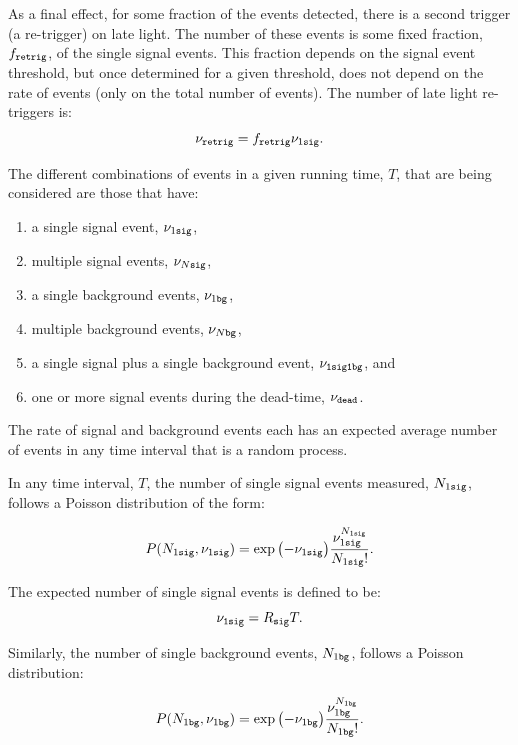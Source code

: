 \documentclass[letter,twocolumn,preprint,3p,numbers,sort&compress]{elsarticle}
\begin{document}
As a final effect, for some fraction of the events detected, there is
a second trigger (a re-trigger) on late light.  The number of these
events is some fixed fraction, $f_{\tt retrig}$, of the single signal
events.  This fraction depends on the signal event threshold, but once
determined for a given threshold, does not depend on the rate of
events (only on the total number of events).  The number of late light
re-triggers is:
\begin{equation}\label{eq:retrig}
\nu_{\tt retrig} = f_{\tt retrig} \nu_{1\tt sig}.
\end{equation}

The different combinations of events in a given running time, $T$,
that are being considered are those that have:
\begin{enumerate}
\item a single signal event, $\nu_{1\tt sig}$,     
\item multiple signal events, $\nu_{N\tt sig}$,    
\item a single background events, $\nu_{1\tt bg}$,
\item multiple background events, $\nu_{N\tt bg}$,
\item a single signal plus a single background event, $\nu_{\tt 1 sig 1 bg}$, and
\item one or more signal events during the dead-time, $\nu_{\tt dead}$. 
\end{enumerate}
The rate of signal and background events each has an expected average
number of events in any time interval that is a random process.

In any time interval, $T$, the number of single signal events
measured, $N_{1\tt sig}$, follows a Poisson distribution of the form:

\begin{equation*}
P( N_{1\tt sig} , \nu_{1\tt sig} ) = \exp{ \left( -\nu_{1\tt sig} \right) } \frac{ \nu_{1\tt sig}^{ N_{1\tt sig} } }{  N_{1\tt sig}! }.
\end{equation*}

The expected number of single signal events is defined to be:
\begin{equation} \label{eq:1sig}
\nu_{\tt 1 sig} = R_{\tt sig} T.
\end{equation}

Similarly, the number of single background events, $N_{1\tt bg}$,
follows a Poisson distribution:

\begin{equation*}
P( N_{1\tt bg}  , \nu_{1\tt bg} ) = \exp{ \left( -\nu_{1\tt bg} \right) } \frac{ \nu_{1\tt bg}^{ N_{1\tt bg} } }{  N_{1\tt bg}! }.
\end{equation*}
\end{document}
